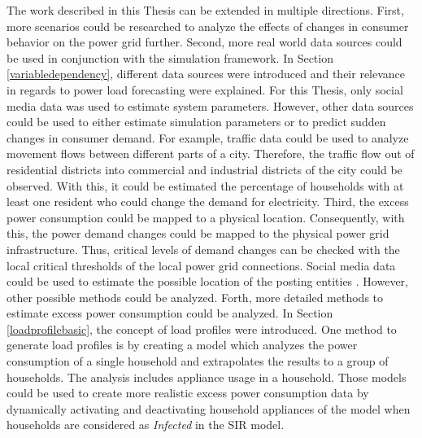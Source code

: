 The work described in this Thesis can be extended in multiple
directions. First, more scenarios could be researched 
to analyze the effects of changes in consumer behavior
on the power grid further. Second, more real world 
data sources could be used in conjunction with the 
simulation framework.
In Section \ref{variabledependency}, different data 
sources were introduced and their relevance in regards 
to power load forecasting were explained. For this
Thesis, only social media data was used to estimate system 
parameters. However, other data sources could be used
to either estimate simulation parameters or to predict
sudden changes in consumer demand. For example,
traffic data could be used to analyze movement flows 
between different parts of a city. Therefore, the
traffic flow out of residential districts into 
commercial and industrial districts of the city 
could be observed. With this, it could be estimated
the percentage of households with at least one 
resident who could change the demand for electricity.
Third, the excess power consumption could be mapped
to a physical location. Consequently, with this, 
the power demand changes could be mapped to the 
physical power grid infrastructure. Thus, 
critical levels of demand changes can be 
checked with the local critical thresholds of the
local power grid connections. Social media data could
be used to estimate the possible location of the 
posting entities \cite{jurgens2015geolocation}.
However, other possible methods could be analyzed.
Forth, more detailed methods to estimate excess 
power consumption could be analyzed.
In Section \ref{loadprofilebasic}, the concept 
of load profiles were introduced. One 
method to generate load profiles is by 
creating a model which 
analyzes the power consumption of a single 
household and extrapolates the results to 
a group of households. The analysis includes 
appliance usage in a household. 
Those models could be used to create more 
realistic excess power consumption data
by dynamically activating and deactivating
household appliances of the model when 
households are considered as 
\textit{Infected} in the SIR model.




